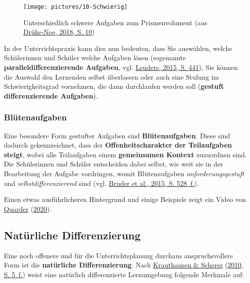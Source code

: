 \documentclass[
  ngerman,
]{scrbook}
\theoremstyle{definition}
\theoremstyle{definition}
\theoremstyle{definition}
\theoremstyle{definition}
\theoremstyle{remark}
\begin{document}
\begin{figure}

{\centering \texttt{[image: pictures/10-Schwierig]} 

}

\caption{Unterschiedlich schwere Aufgaben zum Prismenvolument (aus \protect\hyperlink{ref-Druke-Noe2018}{Drüke-Noe, 2018, S. 10})}\label{fig:Schwierig}
\end{figure}

In der Unterrichtspraxis kann dies nun bedeuten, dass Sie auswählen, welche Schülerinnen und Schüler welche Aufgaben lösen (sogenannte \textbf{paralleldifferenzierende Aufgaben}, vgl. \protect\hyperlink{ref-Leuders2015}{Leuders, 2015, S. 441}), Sie können die Auswahl den Lernenden selbst überlassen oder auch eine Stufung im Schwierigkeitsgrad vornehmen, die dann durchlaufen werden soll (\textbf{gestuft differenzierende Aufgaben}).

\hypertarget{bluxfctenaufgaben}{%
\subsubsection{Blütenaufgaben}\label{bluxfctenaufgaben}}

Eine besondere Form gestufter Aufgaben sind \textbf{Blütenaufgaben}. Diese sind dadurch gekennzeichnet, dass der \textbf{Offenheitscharakter der Teilaufgaben steigt}, wobei alle Teilaufgaben einem \textbf{gemeinsamen Kontext} zuzuordnen sind. Die Schülerinnen und Schüler entscheiden dabei selbst, wie weit sie in der Bearbeitung der Aufgabe vordringen, womit Blütenaufgaben \emph{anforderungsgestuft} und \emph{selbstdifferenzierend} sind (vgl. \protect\hyperlink{ref-Bruder2015a}{Bruder et al., 2015, S. 528~f.}).

Einen etwas ausführlicheren Hintergrund und einige Beispiele zeigt ein Video von \protect\hyperlink{ref-Quarder2020}{Quarder} (\protect\hyperlink{ref-Quarder2020}{2020}).

\hypertarget{natuxfcrliche-differenzierung}{%
\subsection{Natürliche Differenzierung}\label{natuxfcrliche-differenzierung}}

Eine noch offenere und für die Unterrichtsplanung durchaus anspruchsvollere Form ist die \textbf{natürliche Differenzierung}. Nach \protect\hyperlink{ref-Krauthausen2010}{Krauthausen \& Scherer} (\protect\hyperlink{ref-Krauthausen2010}{2010, S. 5~f.}) weist eine natürlich differenzierte Lernumgebung folgende Merkmale auf:
\end{document}

